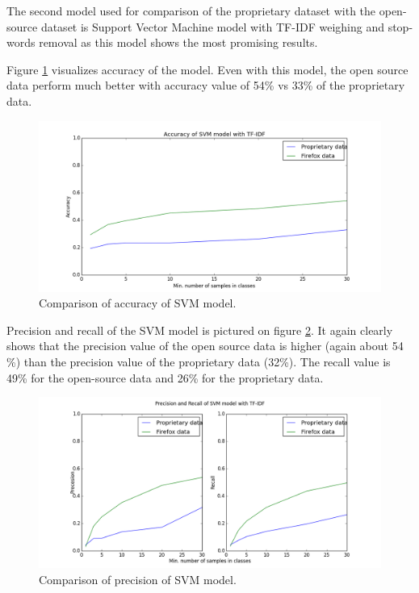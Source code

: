 The second model used for comparison of the proprietary dataset with the open-source dataset is Support Vector Machine model with TF-IDF weighing and stop-words removal as this model shows the most promising results.

Figure \ref{fig:results.datasets.svm_accuracy} visualizes accuracy of the model. Even with this model, the open source data perform much better with accuracy value of 54\% vs 33\% of the proprietary data.

\begin{figure}[htbp]
    \centering
        \includegraphics[width=\textwidth]{./images/prop_vs_os/svm_accuracy.png}
    \caption{Comparison of accuracy of SVM model.}
    \label{fig:results.datasets.svm_accuracy}
\end{figure}

Precision and recall of the SVM model is pictured on figure \ref{fig:results.datasets.svm_pr}. It again clearly shows that the precision value of the open source data is higher (again about 54 \%) than the precision value of the proprietary data (32\%). The recall value is 49\% for the open-source data and 26\% for the proprietary data.

\begin{figure}[htbp]
    \centering
        \includegraphics[width=\textwidth]{./images/prop_vs_os/svm_precision_and_recall.png}
    \caption{Comparison of precision of SVM model.}
    \label{fig:results.datasets.svm_pr}
\end{figure}


